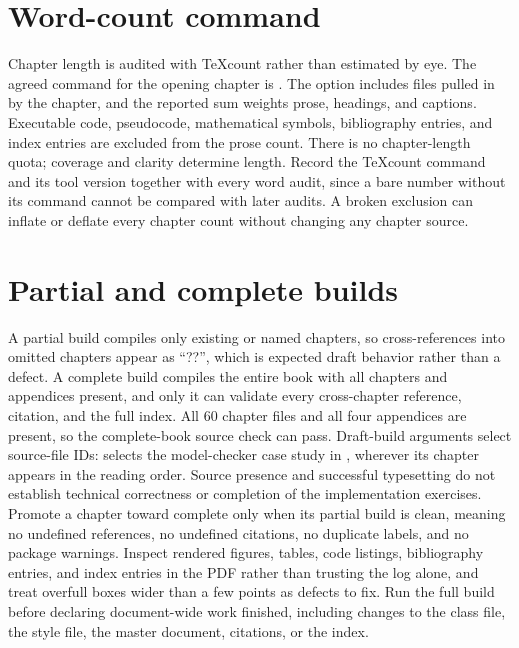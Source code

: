 \section{Word-count command}
\label{sec:app-b-word-count}

Chapter length is audited with TeXcount rather than estimated by eye.
The agreed command for the opening chapter is .
The  option includes files pulled in by the chapter, and the reported sum weights prose, headings, and captions.
Executable code, pseudocode, mathematical symbols, bibliography entries, and index entries are excluded from the prose count.
There is no chapter-length quota; coverage and clarity determine length.
Record the TeXcount command and its tool version together with every word audit, since a bare number without its command cannot be compared with later audits.
A broken exclusion can inflate or deflate every chapter count without changing any chapter source.

\section{Partial and complete builds}
\label{sec:app-b-partial-complete}

A partial build compiles only existing or named chapters, so cross-references into omitted chapters appear as \enquote{??}, which is expected draft behavior rather than a defect.
A complete build compiles the entire book with all chapters and appendices present, and only it can validate every cross-chapter reference, citation, and the full index.
All 60 chapter files and all four appendices are present, so the complete-book source check can pass.
Draft-build arguments select source-file IDs:  selects the model-checker case study in , wherever its chapter appears in the reading order.
Source presence and successful typesetting do not establish technical correctness or completion of the implementation exercises.
Promote a chapter toward complete only when its partial build is clean, meaning no undefined references, no undefined citations, no duplicate labels, and no package warnings.
Inspect rendered figures, tables, code listings, bibliography entries, and index entries in the PDF rather than trusting the log alone, and treat overfull boxes wider than a few points as defects to fix.
Run the full build before declaring document-wide work finished, including changes to the class file, the style file, the master document, citations, or the index.
